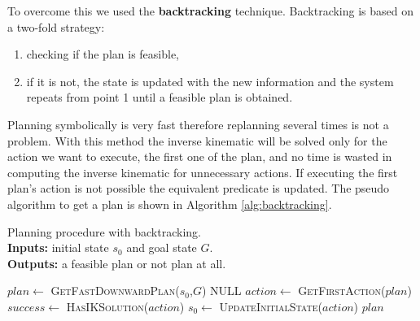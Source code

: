 To overcome this we used the \textbf{backtracking} technique\citep{Bidot2015}. 
Backtracking is based on a two-fold strategy:
\begin{enumerate}
\item checking if the plan is feasible, 
\item if it is not, the state is updated with the new information and the system repeats from point 1 until a feasible plan is obtained.
\end{enumerate} 
Planning symbolically is very fast therefore replanning several times is not a problem. With this method the inverse kinematic will be solved only for the action we want to execute, the first one of the plan, and no time is wasted in computing the inverse kinematic for unnecessary actions. If executing the first plan's action is not possible the equivalent  predicate is updated. The pseudo algorithm to get a plan is shown in Algorithm \ref{alg:backtracking}.

\begin{algorithm}
\caption{Planning procedure with backtracking.\\
\textbf{Inputs:} initial state $s_{0}$ and goal state $G$. \\
\textbf{Outputs:} a feasible plan or not plan at all. }\label{alg:backtracking}
\begin{algorithmic}
\Repeat
  \State $plan \gets$ \textsc{GetFastDownwardPlan}($s_{0}$,$G$)
  		\Return NULL 
  \EndIf
  \State $action\gets$ \textsc{GetFirstAction}($plan$)
  \State $success \gets$ \textsc{HasIKSolution}($action$) 
    \State $s_{0} \gets$ \textsc{UpdateInitialState}($action$) 
  \EndIf
{}
\Return $plan$
\EndProcedure
\end{algorithmic}
\end{algorithm}  



